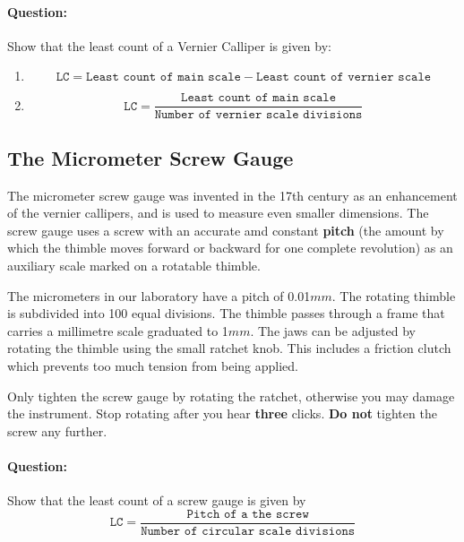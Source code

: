 \begin{question}
\paragraph{Question:} Show that the least count of a Vernier Calliper is given by:
\begin{enumerate}
    \item $$\texttt{LC} = \texttt{Least count of main scale} - \texttt{Least count of vernier scale}$$
    \item $$\texttt{LC} = \frac{\texttt{Least count of main scale}}{\texttt{Number of vernier scale divisions}}$$
\end{enumerate}
\end{question}

\subsection{The Micrometer Screw Gauge}

The micrometer screw gauge was invented in the 17th century as an enhancement of the vernier callipers, and is used to measure even smaller dimensions. The screw gauge uses a screw with an accurate amd constant \textbf{pitch} (the amount by which the thimble moves forward or backward for one complete revolution) as an auxiliary scale marked on a rotatable thimble.  

The micrometers in our laboratory have a pitch of 0.01$mm$.  The rotating thimble is subdivided into 100 equal divisions.  The thimble passes through a frame that carries a millimetre scale graduated to 1$mm$.  The jaws can be adjusted by rotating the thimble using the small ratchet knob.  This includes a friction clutch which prevents too much tension from being applied.

\begin{imp}
Only tighten the screw gauge by rotating the ratchet, otherwise you may damage the instrument. Stop rotating after you hear \textbf{three} clicks. \textbf{Do not} tighten the screw any further.
\end{imp}

\begin{question}
\paragraph{Question:} Show that the least count of a screw gauge is given by
$$\texttt{LC} = \frac{\texttt{Pitch of a the screw}}{\texttt{Number of circular scale divisions}}$$
\end{question}

